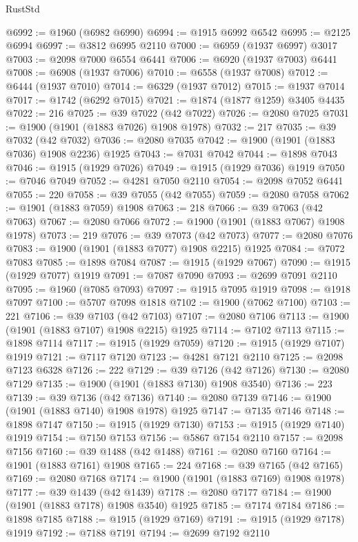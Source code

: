 \begin{lexlean}{RustStd}
\begin{coremodule}
{\begin{coremodule}
{{{{{{{{{{{{{{{{{{{{{{{{{{{{{{{{{{{{{{{{{{{@6992 := @1960 (@6982 @6990)
@6994 := @1915 @6992 @6542
@6995 := @2125 @6994
@6997 := @3812 @6995 @2110
@7000 := @6959 (@1937 @6997) @3017
@7003 := @2098 @7000 @6554 @6441
@7006 := @6920 (@1937 @7003) @6441
@7008 := @6908 (@1937 @7006)
@7010 := @6558 (@1937 @7008)
@7012 := @6444 (@1937 @7010)
@7014 := @6329 (@1937 @7012)
@7015 := @1937 @7014
@7017 := @1742 (@6292 @7015)
@7021 := @1874 (@1877 @1259) @3405 @4435
@7022 := 216
@7025 := @39 @7022 (@42 @7022)
@7026 := @2080 @7025
@7031 := @1900 (@1901 (@1883 @7026) @1908 @1978)
@7032 := 217
@7035 := @39 @7032 (@42 @7032)
@7036 := @2080 @7035
@7042 := @1900 (@1901 (@1883 @7036) @1908 @2236) @1925
@7043 := @7031 @7042
@7044 := @1898 @7043
@7046 := @1915 (@1929 @7026)
@7049 := @1915 (@1929 @7036) @1919
@7050 := @7046 @7049
@7052 := @4281 @7050 @2110
@7054 := @2098 @7052 @6441
@7055 := 220
@7058 := @39 @7055 (@42 @7055)
@7059 := @2080 @7058
@7062 := @1901 (@1883 @7059) @1908
@7063 := 218
@7066 := @39 @7063 (@42 @7063)
@7067 := @2080 @7066
@7072 := @1900 (@1901 (@1883 @7067) @1908 @1978)
@7073 := 219
@7076 := @39 @7073 (@42 @7073)
@7077 := @2080 @7076
@7083 := @1900 (@1901 (@1883 @7077) @1908 @2215) @1925
@7084 := @7072 @7083
@7085 := @1898 @7084
@7087 := @1915 (@1929 @7067)
@7090 := @1915 (@1929 @7077) @1919
@7091 := @7087 @7090
@7093 := @2699 @7091 @2110
@7095 := @1960 (@7085 @7093)
@7097 := @1915 @7095 @1919
@7098 := @1918 @7097
@7100 := @5707 @7098 @1818
@7102 := @1900 (@7062 @7100)
@7103 := 221
@7106 := @39 @7103 (@42 @7103)
@7107 := @2080 @7106
@7113 := @1900 (@1901 (@1883 @7107) @1908 @2215) @1925
@7114 := @7102 @7113
@7115 := @1898 @7114
@7117 := @1915 (@1929 @7059)
@7120 := @1915 (@1929 @7107) @1919
@7121 := @7117 @7120
@7123 := @4281 @7121 @2110
@7125 := @2098 @7123 @6328
@7126 := 222
@7129 := @39 @7126 (@42 @7126)
@7130 := @2080 @7129
@7135 := @1900 (@1901 (@1883 @7130) @1908 @3540)
@7136 := 223
@7139 := @39 @7136 (@42 @7136)
@7140 := @2080 @7139
@7146 := @1900 (@1901 (@1883 @7140) @1908 @1978) @1925
@7147 := @7135 @7146
@7148 := @1898 @7147
@7150 := @1915 (@1929 @7130)
@7153 := @1915 (@1929 @7140) @1919
@7154 := @7150 @7153
@7156 := @5867 @7154 @2110
@7157 := @2098 @7156
@7160 := @39 @1488 (@42 @1488)
@7161 := @2080 @7160
@7164 := @1901 (@1883 @7161) @1908
@7165 := 224
@7168 := @39 @7165 (@42 @7165)
@7169 := @2080 @7168
@7174 := @1900 (@1901 (@1883 @7169) @1908 @1978)
@7177 := @39 @1439 (@42 @1439)
@7178 := @2080 @7177
@7184 := @1900 (@1901 (@1883 @7178) @1908 @3540) @1925
@7185 := @7174 @7184
@7186 := @1898 @7185
@7188 := @1915 (@1929 @7169)
@7191 := @1915 (@1929 @7178) @1919
@7192 := @7188 @7191
@7194 := @2699 @7192 @2110
}}}}}}}}}}}}}}}}}}}}}}}}}}}}}}}}}}}}}}}}}}}
\end{coremodule}}
\end{coremodule}
\end{lexlean}
